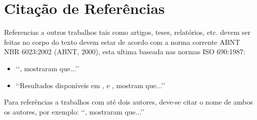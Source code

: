 \section{Citação de Referências}

Referencias a outros trabalhos tais como artigos, teses, relatórios, etc. devem
ser feitas no corpo do texto devem estar de acordo com a norma corrente ABNT
NBR 6023:2002 (ABNT, 2000), esta ultima baseada nas normas ISO 690:1987:
\begin{itemize}
	\item \lq\lq \cite{bordalo1989}, mostraram que...\rq\rq

	\item \lq\lq Resultados disponíveis em \cite{coimbra1978}, \cite{clark1986}
	e \cite{sparrow1980}, mostram que...\rq\rq
\end{itemize}

Para referências a trabalhos com até dois autores, deve-se citar o nome de
ambos os autores, por exemplo: \lq\lq \cite{soviero1997}, mostraram
que...\rq\rq
